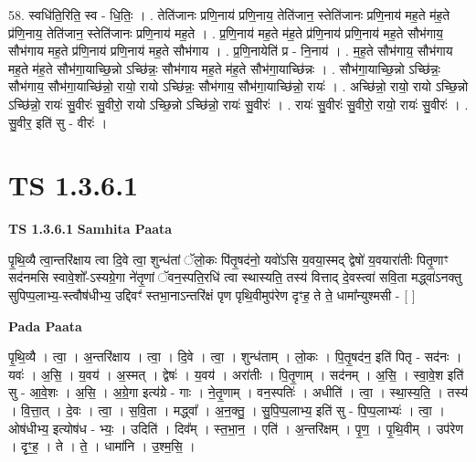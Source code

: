 \documentclass[17pt]{extarticle}
\begin{document}
58. स्वधि॑ति॒रिति॒ स्व - धि॒तिः॒ । . तेति॑जानः प्रणि॒नाय॑ प्रणि॒नाय॒ तेति॑जान॒ स्तेति॑जानः प्रणि॒नाय॑ मह॒ते म॑ह॒ते प्र॑णि॒नाय॒ तेति॑जान॒ स्तेति॑जानः प्रणि॒नाय॑ मह॒ते । . प्र॒णि॒नाय॑ मह॒ते म॑ह॒ते प्र॑णि॒नाय॑ प्रणि॒नाय॑ मह॒ते सौभ॑गाय॒ सौभ॑गाय मह॒ते प्र॑णि॒नाय॑ प्रणि॒नाय॑ मह॒ते सौभ॑गाय । . प्र॒णि॒नायेति॑ प्र - नि॒नाय॑ । . म॒ह॒ते सौभ॑गाय॒ सौभ॑गाय मह॒ते म॑ह॒ते सौभ॑गा॒याच्छि॒न्नो ऽच्छि॑न्नः॒ सौभ॑गाय मह॒ते म॑ह॒ते सौभ॑गा॒याच्छि॑न्नः । . सौभ॑गा॒याच्छि॒न्नो ऽच्छि॑न्नः॒ सौभ॑गाय॒ सौभ॑गा॒याच्छि॑न्नो॒ रायो॒ रायो ऽच्छि॑न्नः॒ सौभ॑गाय॒ सौभ॑गा॒याच्छि॑न्नो॒ रायः॑ । . अच्छि॑न्नो॒ रायो॒ रायो ऽच्छि॒न्नो ऽच्छि॑न्नो॒ रायः॑ सु॒वीरः॑ सु॒वीरो॒ रायो ऽच्छि॒न्नो ऽच्छि॑न्नो॒ रायः॑ सु॒वीरः॑ । . रायः॑ सु॒वीरः॑ सु॒वीरो॒ रायो॒ रायः॑ सु॒वीरः॑ । . सु॒वीर॒ इति॑ सु - वीरः॑ । \newline
\pagebreak
{}
\section*{ TS 1.3.6.1 }

\textbf{TS 1.3.6.1 } \newline
\textbf{Samhita Paata} \newline

पृ॒थि॒व्यै त्वा॒न्तरि॑क्षाय त्वा दि॒वे त्वा॒ शुन्ध॑तां ॅलो॒कः पि॑तृ॒षद॑नो॒ यवो॑ऽसि य॒वया॒स्मद् द्वेषो॑ य॒वयारा॑तीः पितृ॒णाꣳ सद॑नमसि स्वावे॒शो᳚-ऽस्यग्रे॒गा ने॑तृ॒णां ॅवन॒स्पति॒रधि॑ त्वा स्थास्यति॒ तस्य॑ वित्ताद् दे॒वस्त्वा॑ सवि॒ता मद्ध्वा॑ऽनक्तु सुपिप्प॒लाभ्य॒-स्त्वौष॑धीभ्य॒ उद्दिवꣳ॑ स्तभा॒नाऽन्तरि॑क्षं पृण पृथि॒वीमुप॑रेण दृꣳह॒ ते ते॒ धामा᳚न्युश्मसी - [ ] \newline

\textbf{Pada Paata} \newline

पृ॒थि॒व्यै । त्वा॒ । अ॒न्तरि॑क्षाय । त्वा॒ । दि॒वे । त्वा॒ । शुन्ध॑ताम् । लो॒कः । पि॒तृ॒षद॑न॒ इति॑ पितृ - सद॑नः । यवः॑ । अ॒सि॒ । य॒वय॑ । अ॒स्मत् । द्वेषः॑ । य॒वय॑ । अरा॑तीः । पि॒तृ॒णाम् । सद॑नम् । अ॒सि॒ । स्वा॒वे॒श इति॑ सु - आ॒वे॒शः । अ॒सि॒ । अ॒ग्रे॒गा इत्य॑ग्रे - गाः । ने॒तृ॒णाम् । वन॒स्पतिः॑ । अधीति॑ । त्वा॒ । स्था॒स्य॒ति॒ । तस्य॑ । वि॒त्ता॒त् । दे॒वः । त्वा॒ । स॒वि॒ता । मद्ध्वा᳚ । अ॒न॒क्तु॒ । सु॒पि॒प्प॒लाभ्य॒ इति॑ सु - पि॒प्प॒लाभ्यः॑ । त्वा॒ । ओष॑धीभ्य॒ इत्योष॑ध - भ्यः॒ । उदिति॑ । दिव᳚म् । स्त॒भा॒न॒ । एति॑ । अ॒न्तरि॑क्षम् । पृ॒ण॒ । पृ॒थि॒वीम् । उप॑रेण । दृꣳ॒॒ह॒ । ते । ते॒ । धामा॑नि । उ॒श्म॒सि॒ ।  \newline
\end{document}

